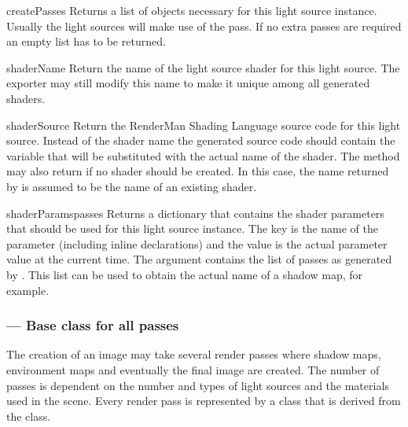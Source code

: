 \begin{methoddesc}[ILightSource]{createPasses}{}
Returns a list of  objects necessary for this light
source instance. Usually the light sources will make use of the
 pass. If no extra passes are required an empty
list has to be returned.
\end{methoddesc}

\begin{methoddesc}[ILightSource]{shaderName}{}
Return the name of the light source shader for this light source.
The exporter may still modify this name to make it unique among all
generated shaders.
\end{methoddesc}

\begin{methoddesc}[ILightSource]{shaderSource}{}
Return the RenderMan Shading Language source code for this light source.
Instead of the shader name the generated source code should contain
the variable  that will be substituted with the
actual name of the shader. The method may also return  if
no shader should be created. In this case, the name returned by
 is assumed to be the name of an existing shader.
\end{methoddesc}

\begin{methoddesc}[ILightSource]{shaderParams}{passes}
Returns a dictionary that contains the shader parameters that should
be used for this light source instance. The key is the name of the
parameter (including inline declarations) and the value is the actual
parameter value at the current time. The  argument contains
the list of passes as generated by . This list
can be used to obtain the actual name of a shadow map, for example.
\end{methoddesc}

\subsubsection{ --- Base class for all passes}

The creation of an image may take several render passes where shadow maps,
environment maps and eventually the final image are created. The number 
of passes is dependent on the number and types of light sources and the 
materials used in the scene. Every render pass is represented by a class
that is derived from the  class.

